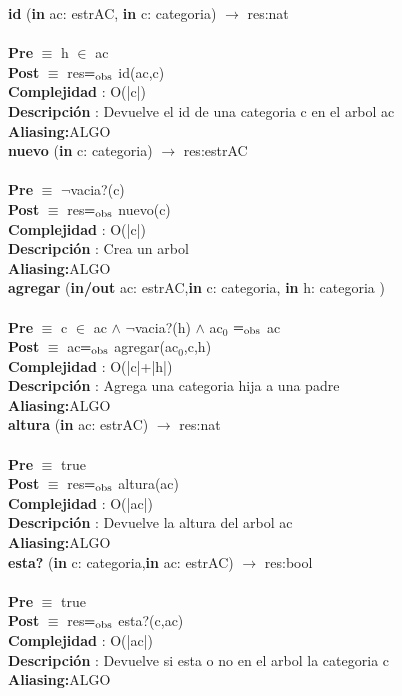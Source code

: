 \documentclass[10pt, a4paper]{article}
\begin{document}
	\textbf{id} (\textbf{in} ac: estrAC, \textbf{in} c: categoria) $\longrightarrow$ res:nat\\\\
	\textbf{Pre} $\equiv$ {h $\in$ ac}\\
	\textbf{Post} $\equiv$ {res$=_{\mathrm{obs}}$ id(ac,c)}\\
	\textbf{Complejidad} : O(|c|)\\
	\textbf{Descripci\'{o}n} : Devuelve el id de una categoria c en el arbol ac\\
	\textbf{Aliasing:}ALGO \\
	
	\textbf{nuevo} (\textbf{in} c: categoria) $\longrightarrow$ res:estrAC\\\\
	\textbf{Pre} $\equiv$ {$¬$vacia?(c)}\\
	\textbf{Post} $\equiv$ {res$=_{\mathrm{obs}}$ nuevo(c)}\\
	\textbf{Complejidad} : O(|c|)\\
	\textbf{Descripci\'{o}n} : Crea un arbol\\
	\textbf{Aliasing:}ALGO \\
	
	\textbf{agregar} (\textbf{in/out} ac: estrAC,\textbf{in} c: categoria, \textbf{in} h: categoria )\\\\
	\textbf{Pre} $\equiv$ {c $\in$ ac $\wedge$ $¬$vacia?(h) $\wedge$ ac${_0}$ $=_{\mathrm{obs}}$ ac}\\
	\textbf{Post} $\equiv$ {ac$=_{\mathrm{obs}}$ agregar(ac${_0}$,c,h)}\\
	\textbf{Complejidad} : O(|c|+|h|)\\
	\textbf{Descripci\'{o}n} : Agrega una categoria hija a una padre\\
	\textbf{Aliasing:}ALGO \\
	
	\textbf{altura} (\textbf{in} ac: estrAC) $\longrightarrow$ res:nat\\\\
	\textbf{Pre} $\equiv$ {true}\\
	\textbf{Post} $\equiv$ {res$=_{\mathrm{obs}}$ altura(ac)}\\
	\textbf{Complejidad} : O(|ac|)\\
	\textbf{Descripci\'{o}n} : Devuelve la altura del arbol ac\\
	\textbf{Aliasing:}ALGO \\
	
	\textbf{esta?} (\textbf{in} c: categoria,\textbf{in} ac: estrAC) $\longrightarrow$ res:bool\\\\
	\textbf{Pre} $\equiv$ {true}\\
	\textbf{Post} $\equiv$ {res$=_{\mathrm{obs}}$ esta?(c,ac)}\\
	\textbf{Complejidad} : O(|ac|)\\
	\textbf{Descripci\'{o}n} : Devuelve si esta o no en el arbol la categoria c\\
	\textbf{Aliasing:}ALGO \\
	
\end{document}
